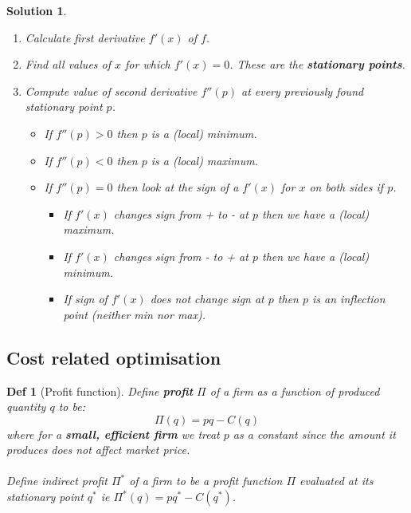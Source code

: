 \documentclass[11pt,a4paper, margin]{article}
\theoremstyle{break}
\theoremstyle{break}
\newtheorem*{solution}{Solution}
\newtheorem*{definition}{Def}
\begin{document}
\begin{solution}
\begin{enumerate}
	\item Calculate first derivative $f'(x)$ of $f$.
	\item Find all values of $x$ for which $f'(x)=0$. These are the \textbf{stationary points}.
	\item Compute value of second derivative $f''(p)$ at every previously found stationary point $p$.
	\begin{itemize}
		\item If $f''(p) > 0$ then $p$ is a (local) minimum.
		\item If $f''(p) < 0$ then $p$ is a (local) maximum.
		\item If $f''(p) = 0$ then look at the sign of a $f'(x)$ for $x$ on both sides if $p$.
		\begin{itemize}
			\item If $f'(x)$ changes sign from + to - at $p$ then we have a (local) maximum.
			\item If $f'(x)$ changes sign from - to + at $p$ then we have a (local) minimum.
			\item If sign of $f'(x)$ does not change sign at $p$ then $p$ is an inflection point (neither min nor max).
		\end{itemize}
	\end{itemize}
\end{enumerate}
\end{solution}

\subsection{Cost related optimisation}

\begin{definition} [Profit function]
Define \textbf{profit} $\Pi$ of a firm as a function of produced quantity $q$ to be:
\[\Pi(q) = pq - C(q)\]
where for a \textbf{small, efficient firm} we treat $p$ as a constant since the amount it produces does not affect market price.\\\\
Define indirect profit $\Pi^\ast$ of a firm to be a profit function $\Pi$ evaluated at its stationary point $q^\ast$ ie $\Pi^\ast(q) = pq^\ast - C(q^\ast)$. 
\end{definition}
\end{document}
